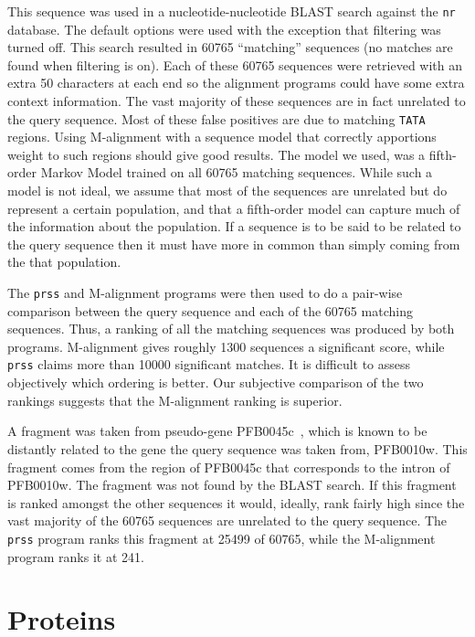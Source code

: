 \documentclass[letterpaper,11pt,oneside]{article}
\begin{document}
\begin{multicols}{2}
This sequence was used in a nucleotide-nucleotide BLAST search against the
\verb!nr! database.  The default options were used with the exception that
filtering was turned off.  This search resulted in 60765 ``matching''
sequences (no matches are found when filtering is on).  Each of these 60765
sequences were retrieved with an extra 50 characters at each end so the
alignment programs could have some extra context information.  The vast
majority of these sequences are in fact unrelated to the query sequence.  Most
of these false positives are due to matching \verb!TATA! regions.  Using
M-alignment with a sequence model that correctly apportions weight to such
regions should give good results.  The model we used, was a fifth-order Markov
Model trained on all 60765 matching sequences.  While such a model is not
ideal, we assume that most of the sequences are unrelated but do represent a
certain population, and that a fifth-order model can capture much of the
information about the population.  If a sequence is to be said to be related
to the query sequence then it must have more in common than simply coming from
the that population.

The \verb!prss! and M-alignment programs were then used to do a pair-wise
comparison between the query sequence and each of the 60765 matching
sequences.  Thus, a ranking of all the matching sequences was produced by both
programs.  M-alignment gives roughly 1300 sequences a significant score, while
\verb!prss! claims more than 10000 significant matches.  It is difficult
to assess objectively which ordering is better.  Our subjective comparison of
the two rankings suggests that the M-alignment ranking is superior.

A fragment was taken from pseudo-gene PFB0045c~\cite{huestis01}, which is
known to be distantly related to the gene the query sequence was taken from,
PFB0010w.  This fragment comes from the region of PFB0045c that corresponds to
the intron of PFB0010w.  The fragment was not found by the BLAST search.  If
this fragment is ranked amongst the other sequences it would, ideally, rank
fairly high since the vast majority of the 60765 sequences are unrelated to
the query sequence.  The \verb!prss! program ranks this fragment at 25499 of
60765, while the M-alignment program ranks it at 241.

\section{Proteins}


\end{multicols}
\end{document}
